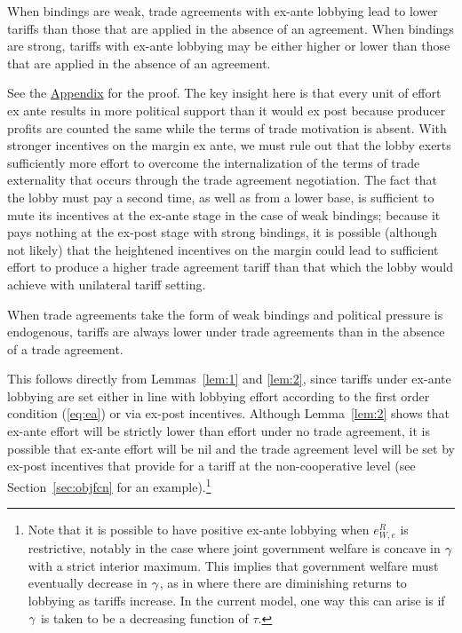 \begin{lemma}
  When bindings are weak, trade agreements with ex-ante lobbying lead to lower tariffs than those that are applied in the absence of an agreement. When bindings are strong, tariffs with ex-ante lobbying may be either higher or lower than those that are applied in the absence of an agreement.
	\label{lem:2}
\end{lemma}

See the \hyperlink{lem1}{Appendix} for the proof. The key insight here is that every unit of effort ex ante results in more political support than it would ex post because producer profits are counted the same while the terms of trade motivation is absent. With stronger incentives on the margin ex ante, we must rule out that the lobby exerts sufficiently more effort to overcome the internalization of the terms of trade externality that occurs through the trade agreement negotiation. The fact that the lobby must pay a second time, as well as from a lower base, is sufficient to mute its incentives at the ex-ante stage in the case of weak bindings; because it pays nothing at the ex-post stage with strong bindings, it is possible (although not likely) that the heightened incentives on the margin could lead to sufficient effort to produce a higher trade agreement tariff than that which the lobby would achieve with unilateral tariff setting. 

\begin{result}
	When trade agreements take the form of weak bindings and political pressure is endogenous, tariffs are always lower under trade agreements than in the absence of a trade agreement. 
\end{result}

This follows directly from Lemmas~\ref{lem:1} and \ref{lem:2}, since tariffs under ex-ante lobbying are set either in line with lobbying effort according to the first order condition (\ref{eq:ea}) or via ex-post incentives. Although Lemma~\ref{lem:2} shows that ex-ante effort will be strictly lower than effort under no trade agreement, it is possible that ex-ante effort will be nil and the trade agreement level will be set by ex-post incentives that provide for a tariff at the non-cooperative level (see Section~\ref{sec:objfcn} for an example).\footnote{Note that it is possible to have positive ex-ante lobbying when $e^R_{W,e}$ is restrictive, notably in the case where joint government welfare is concave in $\gamma$ with a strict interior maximum. This implies that government welfare must eventually decrease in $\gamma$, as in \Textcite{ethier2012} where there are diminishing returns to lobbying as tariffs increase. In the current model, one way this can arise is if $\gamma$ is taken to be a decreasing function of $\tau$.}

